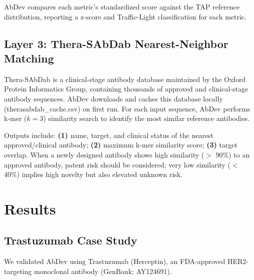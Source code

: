 \documentclass[12pt,a4paper]{article}
\begin{document}
AbDev compares each metric's standardized score against the TAP reference distribution, reporting a z-score and Traffic-Light classification for each metric.

\subsection{Layer 3: Thera-SAbDab Nearest-Neighbor Matching}

Thera-SAbDab is a clinical-stage antibody database maintained by the Oxford Protein Informatics Group, containing thousands of approved and clinical-stage antibody sequences. AbDev downloads and caches this database locally (therasabdab\_cache.csv) on first run. For each input sequence, AbDev performs k-mer ($k=3$) similarity search to identify the most similar reference antibodies.

Outputs include: \textbf{(1)} name, target, and clinical status of the nearest approved/clinical antibody; \textbf{(2)} maximum k-mer similarity score; \textbf{(3)} target overlap. When a newly designed antibody shows high similarity ($>$ 90\%) to an approved antibody, patent risk should be considered; very low similarity ($<$ 40\%) implies high novelty but also elevated unknown risk.

\section{Results}

\subsection{Trastuzumab Case Study}

We validated AbDev using Trastuzumab (Herceptin), an FDA-approved HER2-targeting monoclonal antibody (GenBank: AY124691).
\end{document}
